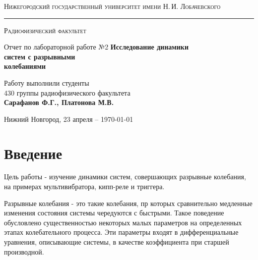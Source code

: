 \documentclass[a4paper,14pt]{extarticle}
\def\labauthors{Сарафанов Ф.Г., Платонова М.В.}
\def\labnumber{2}
\begin{document}
\begin{titlepage}
\begin{center}
{\small\textsc{Нижегородский государственный университет имени Н.\,И. Лобачевского}}
\vskip 2pt \hrule \vskip 3pt
{\small\textsc{Радиофизический факультет}}

\vfill


{{\large Отчет по лабораторной работе №\labnumber}\vskip 12pt {\Huge \bfseries Исследование динамики\\[0em] систем с разрывными \\[0.2em]колебаниями}}

	
\vspace{2cm}
{\large Работу выполнили студенты \\[-0.25em] 430 группы радиофизического факультета \\[0.5em] {\Large \bfseries \labauthors}}



\end{center}

\vfill
	
	
	
\begin{center}
	{Нижний Новгород, 23 апреля -- \today}
\end{center}

\end{titlepage}
\tableofcontents
\newpage





\section*{Введение}
Цель работы - изучение динамики систем, совершающих разрывные колебания, на примерах мультивибратора, кипп-реле и триггера.

Разрывные колебания - это такие колебания, пр которых сравнительно медленные изменения состояния системы чередуются с быстрыми. Такое поведение обусловлено существенностью некоторых малых параметров на определенных этапах колебательного процесса. Эти параметры входят в дифференциальные уравнения, описывающие системы, в качестве коэффициента при старшей производной. 
\end{document}
